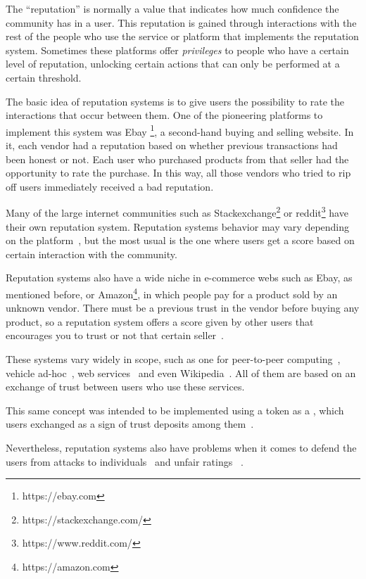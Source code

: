 The ``reputation'' is normally a value that indicates how much confidence the
community has in a user. This reputation is gained through interactions with the
rest of the people who use the service or platform that implements the
reputation system. Sometimes these platforms offer \emph{privileges} to people
who have a certain level of reputation, unlocking certain actions that can only
be performed at a certain threshold.

The basic idea of reputation systems is to give users the possibility to rate
the interactions that occur between them. One of the pioneering platforms to
implement this system was Ebay \footnote{https://ebay.com}, a second-hand buying
and selling website. In it, each vendor had a reputation based on whether
previous transactions had been honest or not. Each user who purchased products
from that seller had the opportunity to rate the purchase. In this way, all
those vendors who tried to rip off users immediately received a bad reputation.

Many of the large internet communities such as
Stackexchange\footnote{https://stackexchange.com/} or
reddit\footnote{https://www.reddit.com/} have their own reputation system.
Reputation systems behavior may vary depending on the
platform~\cite{josang2002beta}, but the most usual is the one where users get a
score based on certain interaction with the community.

Reputation systems also have a wide niche in e-commerce webs such as Ebay, as
mentioned before, or Amazon\footnote{https://amazon.com}, in which people pay
for a product sold by an unknown vendor. There must be a previous trust in the
vendor before buying any product, so a reputation system offers a score given by
other users that encourages you to trust or not that certain
seller~\cite{resnick2002trust}.

These systems vary widely in scope, such as one for peer-to-peer
computing~\cite{zhou2007powertrust}, vehicle ad-hoc~\cite{dotzer2005vars}, web
services~\cite{moore2008reputation} and even Wikipedia~\cite{adler2007content}.
All of them are based on an exchange of trust between users who use these
services.

This same concept was intended to be implemented using a token as a , which users exchanged as a sign of trust deposits among
them~\cite{sharples2016blockchain}.

Nevertheless, reputation systems also have problems when it comes to defend the
users from attacks to individuals~\cite{hoffman2009survey} and unfair ratings
~\cite{whitby2004filtering}.

